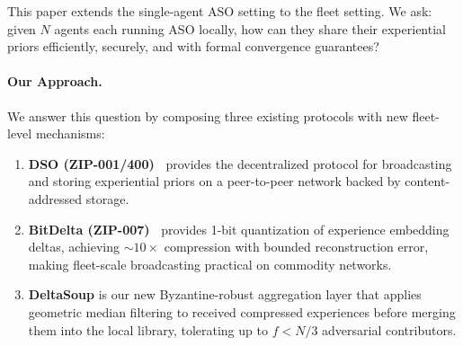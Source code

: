 This paper extends the single-agent ASO setting to the fleet setting.
We ask: given $N$ agents each running ASO locally, how can they share their
experiential priors efficiently, securely, and with formal convergence
guarantees?

\paragraph{Our Approach.}
We answer this question by composing three existing protocols with new
fleet-level mechanisms:

\begin{enumerate}[leftmargin=1.5em]
    \item \textbf{DSO (ZIP-001/400)~\cite{hanzo2026dso}} provides the
          decentralized protocol for broadcasting and storing experiential
          priors on a peer-to-peer network backed by content-addressed storage.
    \item \textbf{BitDelta (ZIP-007)~\cite{hanzo2026bitdelta}} provides 1-bit
          quantization of experience embedding deltas, achieving ${\sim}10\times$
          compression with bounded reconstruction error, making fleet-scale
          broadcasting practical on commodity networks.
    \item \textbf{DeltaSoup} is our new Byzantine-robust aggregation layer
          that applies geometric median filtering to received compressed
          experiences before merging them into the local library, tolerating
          up to $f < N/3$ adversarial contributors.
\end{enumerate}

